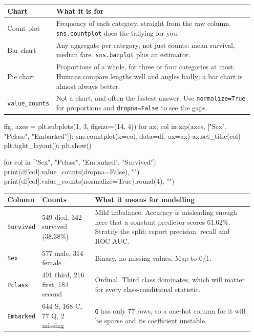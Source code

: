 \documentclass[11pt,a4paper]{article}
\begin{document}
\begin{tabularx}{\textwidth}{@{}l X@{}}
\toprule
\rowcolor{tablehead} \textbf{Chart} & \textbf{What it is for} \\
\midrule
Count plot & Frequency of each category, straight from the raw column. \lstinline|sns.countplot| does the tallying for you. \\
Bar chart & Any aggregate per category, not just counts: mean survival, median fare. \lstinline|sns.barplot| plus an estimator. \\
Pie chart & Proportions of a whole, for three or four categories at most. Humans compare lengths well and angles badly; a bar chart is almost always better. \\
\lstinline|value_counts| & Not a chart, and often the fastest answer. Use \lstinline|normalize=True| for proportions and \lstinline|dropna=False| to see the gaps. \\
\bottomrule
\end{tabularx}

\begin{py}
fig, axes = plt.subplots(1, 3, figsize=(14, 4))
for ax, col in zip(axes, ["Sex", "Pclass", "Embarked"]):
    sns.countplot(x=col, data=df, ax=ax)
    ax.set_title(col)
plt.tight_layout(); plt.show()

for col in ["Sex", "Pclass", "Embarked", "Survived"]:
    print(df[col].value_counts(dropna=False), "\n")
    print(df[col].value_counts(normalize=True).round(4), "\n")
\end{py}

\begin{tabularx}{\textwidth}{@{}l X X@{}}
\toprule
\rowcolor{tablehead} \textbf{Column} & \textbf{Counts} & \textbf{What it means for modelling} \\
\midrule
\texttt{Survived} & 549 died, 342 survived (38.38\%) & Mild imbalance. Accuracy is misleading enough here that a constant predictor scores 61.62\%. Stratify the split; report precision, recall and ROC-AUC. \\
\texttt{Sex} & 577 male, 314 female & Binary, no missing values. Map to 0/1. \\
\texttt{Pclass} & 491 third, 216 first, 184 second & Ordinal. Third class dominates, which will matter for every class-conditional statistic. \\
\texttt{Embarked} & 644 S, 168 C, 77 Q, 2 missing & \texttt{Q} has only 77 rows, so a one-hot column for it will be sparse and its coefficient unstable. \\
\bottomrule
\end{tabularx}
\end{document}
